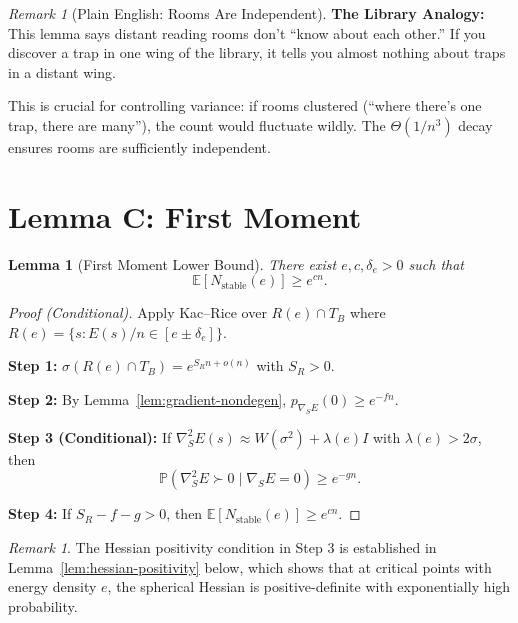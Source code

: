 \documentclass[11pt,a4paper]{article}
\theoremstyle{plain}
\newtheorem{lemma}[theorem]{Lemma}
\theoremstyle{definition}
\theoremstyle{remark}
\newtheorem{remark}[theorem]{Remark}
\newcommand{\E}{\mathbb{E}}
\newcommand{\Prob}{\mathbb{P}}
\begin{document}
\begin{remark}[Plain English: Rooms Are Independent]
\textbf{The Library Analogy:} This lemma says distant reading rooms don't ``know about each other.'' If you discover a trap in one wing of the library, it tells you almost nothing about traps in a distant wing.

This is crucial for controlling variance: if rooms clustered (``where there's one trap, there are many''), the count would fluctuate wildly. The $\Theta(1/n^3)$ decay ensures rooms are sufficiently independent.
\end{remark}

\section{Lemma C: First Moment}

\begin{lemma}[First Moment Lower Bound]
\label{lem:first-moment}
There exist $e, c, \delta_e > 0$ such that
\[
\E[N_{\mathrm{stable}}(e)] \geq e^{cn}.
\]
\end{lemma}

\begin{proof}[Proof (Conditional)]
Apply Kac--Rice over $R(e) \cap T_B$ where $R(e) = \{s : E(s)/n \in [e \pm \delta_e]\}$.

\textbf{Step 1:} $\sigma(R(e) \cap T_B) = e^{S_R n + o(n)}$ with $S_R > 0$.

\textbf{Step 2:} By Lemma~\ref{lem:gradient-nondegen}, $p_{\nabla_S E}(0) \geq e^{-fn}$.

\textbf{Step 3 (Conditional):} If $\nabla_S^2 E(s) \approx W(\sigma^2) + \lambda(e) I$ with $\lambda(e) > 2\sigma$, then
\[
\Prob(\nabla_S^2 E \succ 0 \mid \nabla_S E = 0) \geq e^{-gn}.
\]

\textbf{Step 4:} If $S_R - f - g > 0$, then $\E[N_{\mathrm{stable}}(e)] \geq e^{cn}$.
\end{proof}

\begin{remark}
The Hessian positivity condition in Step 3 is established in Lemma~\ref{lem:hessian-positivity} below, which shows that at critical points with energy density $e$, the spherical Hessian is positive-definite with exponentially high probability.
\end{remark}
\end{document}
